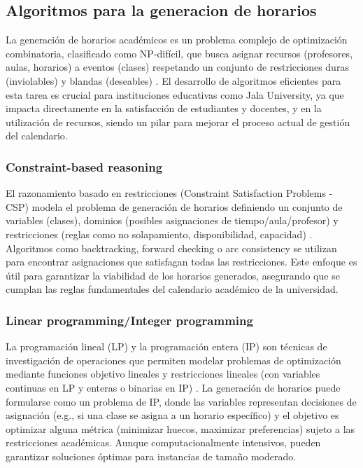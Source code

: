 \subsection{Algoritmos para la generacion de horarios}
La generación de horarios académicos es un problema complejo de optimización combinatoria, clasificado como NP-difícil, que busca asignar recursos (profesores, aulas, horarios) a eventos (clases) respetando un conjunto de restricciones duras (inviolables) y blandas (deseables) \parencite{Schaerf1999}.
El desarrollo de algoritmos eficientes para esta tarea es crucial para instituciones educativas como Jala University, ya que impacta directamente en la satisfacción de estudiantes y docentes, y en la utilización de recursos, siendo un pilar para mejorar el proceso actual de gestión del calendario.

\subsubsection{Constraint-based reasoning}
El razonamiento basado en restricciones (Constraint Satisfaction Problems - CSP) modela el problema de generación de horarios definiendo un conjunto de variables (clases), dominios (posibles asignaciones de tiempo/aula/profesor) y restricciones (reglas como no solapamiento, disponibilidad, capacidad) \parencite{Rossi2006}.
Algoritmos como backtracking, forward checking o arc consistency se utilizan para encontrar asignaciones que satisfagan todas las restricciones.
Este enfoque es útil para garantizar la viabilidad de los horarios generados, asegurando que se cumplan las reglas fundamentales del calendario académico de la universidad.

\subsubsection{Linear programming/Integer programming}
La programación lineal (LP) y la programación entera (IP) son técnicas de investigación de operaciones que permiten modelar problemas de optimización mediante funciones objetivo lineales y restricciones lineales (con variables continuas en LP y enteras o binarias en IP) \parencite{Winston2004}.
La generación de horarios puede formularse como un problema de IP, donde las variables representan decisiones de asignación (e.g., si una clase se asigna a un horario específico) y el objetivo es optimizar alguna métrica (minimizar huecos, maximizar preferencias) sujeto a las restricciones académicas.
Aunque computacionalmente intensivos, pueden garantizar soluciones óptimas para instancias de tamaño moderado.

